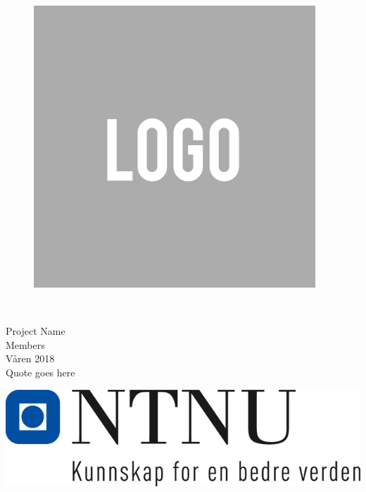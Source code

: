 \thispagestyle{empty}
\begin{figure}
    \centering
    \includegraphics[scale=0.25]{fig/Sample-Logo-square.png}
\end{figure}
\mbox{}\\[5pc]
\begin{center}
\Huge{Project Name}\\[2pc]

\small{Members} \\[3pc]

\large{Våren 2018}\\
Quote goes here\\
\end{center}
\vfill

\noindent \includegraphics[scale=0.2]{fig/NTNULOGO}
